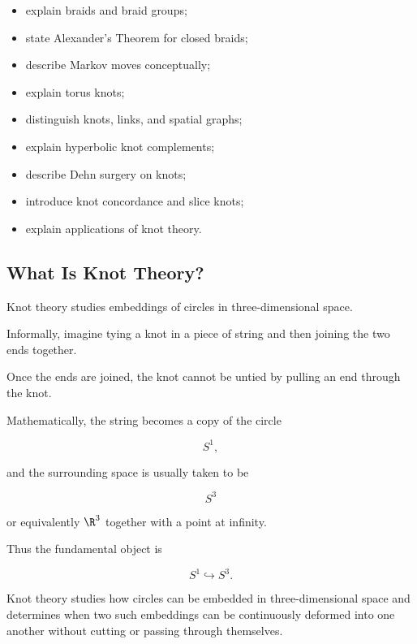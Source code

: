 {\begin{itemize}
    \item explain braids and braid groups;
    \item state Alexander's Theorem for closed braids;
    \item describe Markov moves conceptually;
    \item explain torus knots;
    \item distinguish knots, links, and spatial graphs;
    \item explain hyperbolic knot complements;
    \item describe Dehn surgery on knots;
    \item introduce knot concordance and slice knots;
    \item explain applications of knot theory.
\end{itemize}
}

\subsection{What Is Knot Theory?}
\label{subsec:what-is-knot-theory}

Knot theory studies embeddings of circles in three-dimensional space.

Informally, imagine tying a knot in a piece of string and then joining the
two ends together.

Once the ends are joined, the knot cannot be untied by pulling an end
through the knot.

Mathematically, the string becomes a copy of the circle

\[
S^1,
\]

and the surrounding space is usually taken to be

\[
S^3
\]

or equivalently \(\R^3\) together with a point at infinity.

Thus the fundamental object is

\[
\boxed{
S^1\hookrightarrow S^3.
}
\]

\begin{conceptbox}
Knot theory studies how circles can be embedded in three-dimensional space
and determines when two such embeddings can be continuously deformed into
one another without cutting or passing through themselves.
\end{conceptbox}

